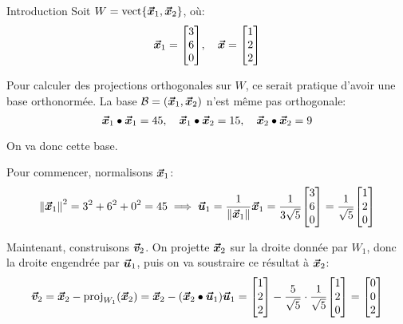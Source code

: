 \documentclass[a4paper]{article}
\begin{document}
\begin{parag}{Introduction}
    Soit $W = \vect\left\{\bvec{x}_1, \bvec{x}_2\right\}$, où: 
    \[\bvec{x}_1 = \begin{bmatrix} 3 \\ 6 \\ 0 \end{bmatrix}, \mathspace \bvec{x} = \begin{bmatrix} 1 \\ 2 \\ 2 \end{bmatrix} \]
    
    Pour calculer des projections orthogonales sur $W$, ce serait pratique d'avoir une base orthonormée. La base $\mathcal{B} = \left(\bvec{x}_1, \bvec{x}_2\right)$ n'est même pas orthogonale: 
    \[\bm{\protect\vec{x}}_1 \bullet \bm{\protect\vec{x}}_1 = 45, \quad \bm{\protect\vec{x}}_1 \bullet \bm{\protect\vec{x}}_2 = 15, \quad \bm{\protect\vec{x}}_2 \bullet \bm{\protect\vec{x}}_2 = 9\]
    
    On va donc  cette base.


    Pour commencer, normalisons $\bm{\protect\vec{x}}_1$: 
    \[\left\|\bvec{x}_1\right\|^2 = 3^2 + 6^2 + 0^2 = 45 \implies \bvec{u}_1 = \frac{1}{\left\|\bvec{x}_1\right\|} \bvec{x}_1 = \frac{1}{3\sqrt{5}} \begin{bmatrix} 3 \\ 6 \\ 0 \end{bmatrix} = \frac{1}{\sqrt{5}} \begin{bmatrix} 1 \\ 2 \\ 0 \end{bmatrix} \]

    Maintenant, construisons $\bm{\protect\vec{v}}_2$. On projette $\bm{\protect\vec{x}}_2$ sur la droite donnée par $W_1$, donc la droite engendrée par $\bm{\protect\vec{u}}_1$, puis on va soustraire ce résultat à $\bm{\protect\vec{x}}_2$:
    \[\bvec{v}_2 = \bvec{x}_2 - \proj_{W_1}\left(\bvec{x}_2\right) = \bvec{x}_2 - \left(\bvec{x}_2 \dotprod \bvec{u}_1\right) \bvec{u}_1 = \begin{bmatrix} 1 \\ 2 \\ 2 \end{bmatrix} - \frac{5}{\sqrt{5}} \cdot \frac{1}{\sqrt{5}} \begin{bmatrix} 1 \\ 2 \\ 0 \end{bmatrix} = \begin{bmatrix} 0 \\ 0 \\ 2 \end{bmatrix} \]
    

\end{parag}
\end{document}
